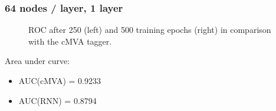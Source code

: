 \documentclass{beamer}
\begin{document}
\begin{frame}
  \frametitle{64 nodes / layer, 1 layer}
    \begin{figure}[htb]
    \centering

    \caption{ROC after 250 (left) and 500 training epochs (right) in comparison with the cMVA tagger.}
    \end{figure}

  Area under curve:
  \begin{itemize}
  \item AUC(cMVA) = 0.9233
  \item AUC(RNN) = 0.8794
  \end{itemize}

\end{frame}
\end{document}
